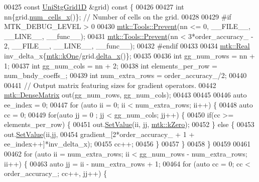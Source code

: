 \begin{DoxyCode}
{{00425   \textcolor{keyword}{const} \hyperlink{classmtk_1_1UniStgGrid1D}{UniStgGrid1D} &grid)\textcolor{keyword}{ const }\{
00426 
00427   \textcolor{keywordtype}{int} nn\{grid.\hyperlink{classmtk_1_1UniStgGrid1D_af1b3729d8afa07be5b2775ed68015b80}{num\_cells\_x}()\}; \textcolor{comment}{// Number of cells on the grid.}
00428 
00429 \textcolor{preprocessor}{  #if MTK\_DEBUG\_LEVEL > 0}
00430   \hyperlink{classmtk_1_1Tools_a332324c6f25e66be9dff48c5987a3b9f}{mtk::Tools::Prevent}(nn <= 0, \_\_FILE\_\_, \_\_LINE\_\_, \_\_func\_\_);
00431   \hyperlink{classmtk_1_1Tools_a332324c6f25e66be9dff48c5987a3b9f}{mtk::Tools::Prevent}(nn < 3*order\_accuracy\_ - 2, \_\_FILE\_\_, \_\_LINE\_\_, \_\_func\_\_);
00432 \textcolor{preprocessor}{  #endif}
00433 
00434   \hyperlink{group__c01-roots_gac080bbbf5cbb5502c9f00405f894857d}{mtk::Real} inv\_delta\_x\{\hyperlink{group__c01-roots_ga26407c24d43b6b95480943340d285c71}{mtk::kOne}/grid.\hyperlink{classmtk_1_1UniStgGrid1D_a6e7173b01241632cf509496d66b9f74c}{delta\_x}()\};
00435 
00436   \textcolor{keywordtype}{int} gg\_num\_rows = nn + 1;
00437   \textcolor{keywordtype}{int} gg\_num\_cols = nn + 2;
00438   \textcolor{keywordtype}{int} elements\_per\_row = num\_bndy\_coeffs\_;
00439   \textcolor{keywordtype}{int} num\_extra\_rows = order\_accuracy\_/2;
00440 
00441   \textcolor{comment}{// Output matrix featuring sizes for gradient operators.}
00442   \hyperlink{classmtk_1_1DenseMatrix}{mtk::DenseMatrix} out(gg\_num\_rows, gg\_num\_cols);
00443 
00445 
00446   \textcolor{keyword}{auto} ee\_index = 0;
00447   \textcolor{keywordflow}{for} (\textcolor{keyword}{auto} ii = 0; ii < num\_extra\_rows; ii++) \{
00448     \textcolor{keyword}{auto} cc = 0;
00449     \textcolor{keywordflow}{for}(\textcolor{keyword}{auto} jj = 0 ; jj < gg\_num\_cols; jj++) \{
00450       \textcolor{keywordflow}{if}(cc >= elements\_per\_row) \{
00451         out.\hyperlink{classmtk_1_1DenseMatrix_a784ce5784109ac86bfb9d8562b334b13}{SetValue}(ii, jj, \hyperlink{group__c01-roots_ga59a451a5fae30d59649bcda274fea271}{mtk::kZero});
00452       \} \textcolor{keywordflow}{else} \{
00453         out.\hyperlink{classmtk_1_1DenseMatrix_a784ce5784109ac86bfb9d8562b334b13}{SetValue}(ii,jj,
00454                      gradient\_[2*order\_accuracy\_ + 1 + ee\_index++]*inv\_delta\_x);
00455         cc++;
00456       \}
00457     \}
00458   \}
00459 
00461 
00462   \textcolor{keywordflow}{for} (\textcolor{keyword}{auto} ii = num\_extra\_rows; ii < gg\_num\_rows - num\_extra\_rows; ii++) \{
00463     \textcolor{keyword}{auto} jj = ii - num\_extra\_rows + 1;
00464     \textcolor{keywordflow}{for} (\textcolor{keyword}{auto} cc = 0; cc < order\_accuracy\_; cc++, jj++) \{
}}
\end{DoxyCode}
